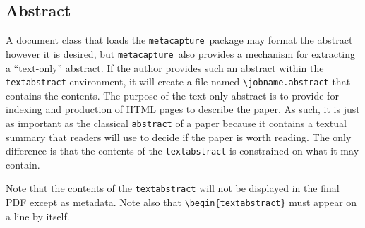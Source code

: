 \documentclass{article}
\newcommand{\pkgname}{\texttt{metacapture}}
\begin{document}
\subsection{Abstract}
A document class that loads the \pkgname\ package may format the
abstract however it is desired, but \pkgname\ also provides a
mechanism for extracting a ``text-only'' abstract. If the author
provides such an abstract within the \texttt{textabstract}
environment, it will create a file
named \texttt{\textbackslash{jobname}.abstract} that contains the
contents.  The purpose of the text-only abstract is to provide for
indexing and production of {HTML} pages to describe the paper. As
such, it is just as important as the classical \texttt{abstract} of a
paper because it contains a textual summary that readers will use to
decide if the paper is worth reading. The only difference is that the
contents of the
\texttt{textabstract} is constrained on what it may contain.

Note that the contents of the \texttt{textabstract} will not be
displayed in the final PDF except as metadata. Note also that
\verb+\begin{textabstract}+ must appear on a line by itself.

\end{document}
